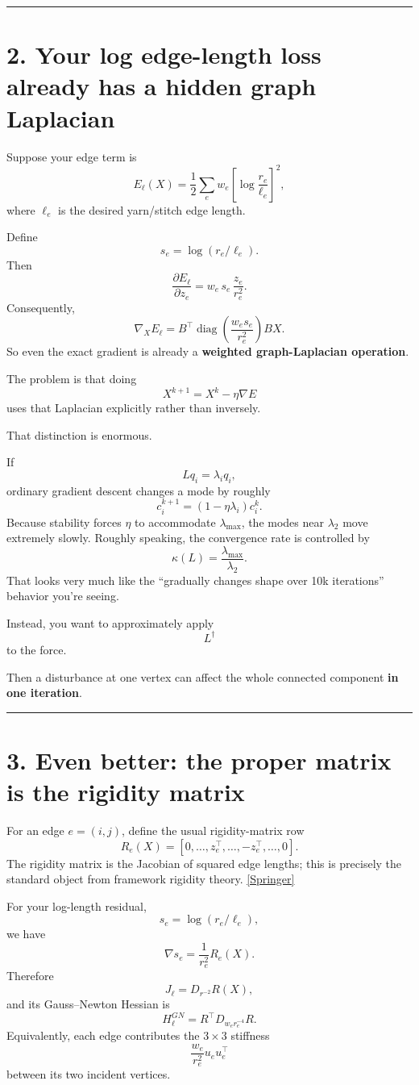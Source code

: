 \documentclass[11pt]{article}
\begin{document}
\bigskip\hrule

\section*{2. Your log edge-length loss already has a hidden graph Laplacian}

Suppose your edge term is
\[
E_\ell(X)
=
\frac12\sum_e
w_e
\left[
\log\frac{r_e}{\ell_e}
\right]^2,
\]
where \(\ell_e\) is the desired yarn/stitch edge length.

Define
\[
s_e=\log(r_e/\ell_e).
\]
Then
\[
\frac{\partial E_\ell}{\partial z_e}
=
w_e\,s_e\,\frac{z_e}{r_e^2}.
\]
Consequently,
\[
\boxed{
\nabla_X E_\ell
=
B^\top
\operatorname{diag}
\left(
\frac{w_e s_e}{r_e^2}
\right)
BX.
}
\]
So even the exact gradient is already a \textbf{weighted graph-Laplacian
operation}.

The problem is that doing
\[
X^{k+1}=X^k-\eta\nabla E
\]
uses that Laplacian explicitly rather than inversely.

That distinction is enormous.

If
\[
Lq_i=\lambda_iq_i,
\]
ordinary gradient descent changes a mode by roughly
\[
c_i^{k+1}
=
(1-\eta\lambda_i)c_i^k.
\]
Because stability forces \(\eta\) to accommodate \(\lambda_{\max}\), the
modes near \(\lambda_2\) move extremely slowly. Roughly speaking, the
convergence rate is controlled by
\[
\kappa(L)=\frac{\lambda_{\max}}{\lambda_2}.
\]
That looks very much like the ``gradually changes shape over 10k
iterations'' behavior you're seeing.

Instead, you want to approximately apply
\[
L^\dagger
\]
to the force.

Then a disturbance at one vertex can affect the whole connected component
\textbf{in one iteration}.

\bigskip\hrule

\section*{3. Even better: the proper matrix is the rigidity matrix}

For an edge \(e=(i,j)\), define the usual rigidity-matrix row
\[
R_e(X)
=
[
0,\ldots,
z_e^\top,
\ldots,
-z_e^\top,
\ldots,0
].
\]
The rigidity matrix is the Jacobian of squared edge lengths; this is
precisely the standard object from framework rigidity theory.
\href{https://link.springer.com/article/10.1007/s00454-021-00275-7?utm_source=chatgpt.com}{[Springer]}

For your log-length residual,
\[
s_e=\log(r_e/\ell_e),
\]
we have
\[
\nabla s_e
=
\frac{1}{r_e^2}R_e(X).
\]
Therefore
\[
J_\ell
=
D_{r^{-2}} R(X),
\]
and its Gauss--Newton Hessian is
\[
\boxed{
H_\ell^{GN}
=
R^\top
D_{w_er_e^{-4}}
R.
}
\]
Equivalently, each edge contributes the \(3\times3\) stiffness
\[
\frac{w_e}{r_e^2}u_eu_e^\top
\]
between its two incident vertices.
\end{document}
